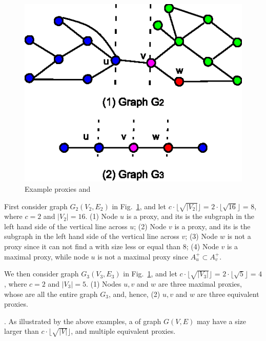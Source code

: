 \begin{figure}
\centering
 \includegraphics[scale=0.95]{./extended-proxies.eps}
 \vspace{-2ex}
 \caption{Example proxies and \dras}
  \label{fig-proxies}
\vspace{-2ex}
\end{figure}


\vspace{-0.5ex}
\begin{example}
\label{exm-proxies} First consider graph $G_2(V_2, E_2)$ in Fig.~\ref{fig-proxies}, and let $c\cdot\lfloor\sqrt{|V_2|}\rfloor$ =
$2\cdot\lfloor\sqrt{16}\rfloor$ = $8$, where $c = 2$ and $|V_2| = 16$.
\sstab(1) Node $u$ is a proxy, and its \dra is the subgraph in the left hand side of the vertical line across $u$;
\sstab(2) Node $v$ is a proxy, and its \dra is the subgraph in the left hand side of the vertical line across $v$;
\sstab(3) Node $w$ is not a proxy since it can not find a \dra with size less or equal than $8$;
\sstab(4)  Node $v$ is a maximal proxy, while node $u$ is not a maximal proxy since $A^+_u\subset A^+_v$.


We then consider graph $G_3(V_3, E_3)$ in Fig.~\ref{fig-proxies}, and let $c\cdot\lfloor\sqrt{|V_3|}\rfloor$ =
$2\cdot\lfloor\sqrt{5}\rfloor$ = $4$, where $c = 2$ and $|V_3| = 5$.
\sstab(1) Nodes $u, v$ and $w$ are three maximal proxies, whose \dras are all the entire graph $G_3$, and, hence,
\sstab(2) $u, v$ and $w$ are three equivalent proxies.
 \end{example}

\vspace{-1ex}
. As illustrated by the above examples,  a \dra of graph $G(V, E)$ may have a size larger than $c\cdot\lfloor\sqrt{|V|}\rfloor$,
and multiple equivalent proxies.


